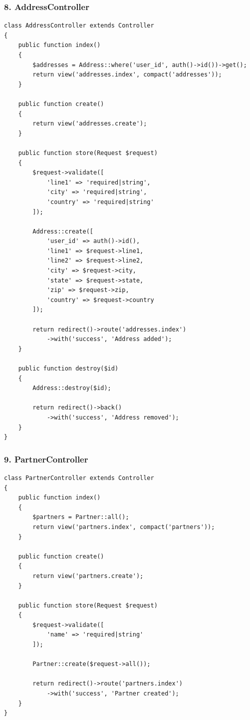 \documentclass[12pt,a4paper]{article}
\begin{document}
\subsubsection{8. AddressController}

\begin{verbatim}
class AddressController extends Controller
{
    public function index()
    {
        $addresses = Address::where('user_id', auth()->id())->get();
        return view('addresses.index', compact('addresses'));
    }

    public function create()
    {
        return view('addresses.create');
    }

    public function store(Request $request)
    {
        $request->validate([
            'line1' => 'required|string',
            'city' => 'required|string',
            'country' => 'required|string'
        ]);

        Address::create([
            'user_id' => auth()->id(),
            'line1' => $request->line1,
            'line2' => $request->line2,
            'city' => $request->city,
            'state' => $request->state,
            'zip' => $request->zip,
            'country' => $request->country
        ]);

        return redirect()->route('addresses.index')
            ->with('success', 'Address added');
    }

    public function destroy($id)
    {
        Address::destroy($id);

        return redirect()->back()
            ->with('success', 'Address removed');
    }
}
\end{verbatim}

\subsubsection{9. PartnerController}

\begin{verbatim}
class PartnerController extends Controller
{
    public function index()
    {
        $partners = Partner::all();
        return view('partners.index', compact('partners'));
    }

    public function create()
    {
        return view('partners.create');
    }

    public function store(Request $request)
    {
        $request->validate([
            'name' => 'required|string'
        ]);

        Partner::create($request->all());

        return redirect()->route('partners.index')
            ->with('success', 'Partner created');
    }
}
\end{verbatim}
\end{document}
